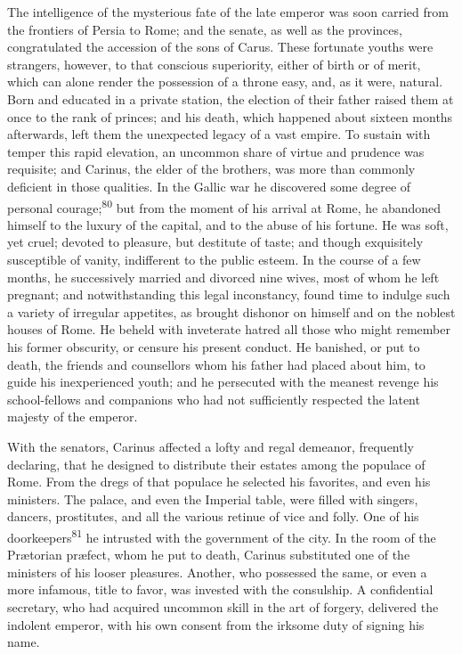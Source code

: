 The intelligence of the mysterious fate of the late emperor was
soon carried from the frontiers of Persia to Rome; and the
senate, as well as the provinces, congratulated the accession of
the sons of Carus. These fortunate youths were strangers,
however, to that conscious superiority, either of birth or of
merit, which can alone render the possession of a throne easy,
and, as it were, natural. Born and educated in a private station,
the election of their father raised them at once to the rank of
princes; and his death, which happened about sixteen months
afterwards, left them the unexpected legacy of a vast empire. To
sustain with temper this rapid elevation, an uncommon share of
virtue and prudence was requisite; and Carinus, the elder of the
brothers, was more than commonly deficient in those qualities. In
the Gallic war he discovered some degree of personal courage;\textsuperscript{80}
but from the moment of his arrival at Rome, he abandoned himself
to the luxury of the capital, and to the abuse of his fortune. He
was soft, yet cruel; devoted to pleasure, but destitute of taste;
and though exquisitely susceptible of vanity, indifferent to the
public esteem. In the course of a few months, he successively
married and divorced nine wives, most of whom he left pregnant;
and notwithstanding this legal inconstancy, found time to indulge
such a variety of irregular appetites, as brought dishonor on
himself and on the noblest houses of Rome. He beheld with
inveterate hatred all those who might remember his former
obscurity, or censure his present conduct. He banished, or put to
death, the friends and counsellors whom his father had placed
about him, to guide his inexperienced youth; and he persecuted
with the meanest revenge his school-fellows and companions who
had not sufficiently respected the latent majesty of the emperor.

With the senators, Carinus affected a lofty and regal demeanor,
frequently declaring, that he designed to distribute their
estates among the populace of Rome. From the dregs of that
populace he selected his favorites, and even his ministers. The
palace, and even the Imperial table, were filled with singers,
dancers, prostitutes, and all the various retinue of vice and
folly. One of his doorkeepers\textsuperscript{81} he intrusted with the government
of the city. In the room of the Prætorian præfect, whom he put to
death, Carinus substituted one of the ministers of his looser
pleasures. Another, who possessed the same, or even a more
infamous, title to favor, was invested with the consulship. A
confidential secretary, who had acquired uncommon skill in the
art of forgery, delivered the indolent emperor, with his own
consent from the irksome duty of signing his name.

